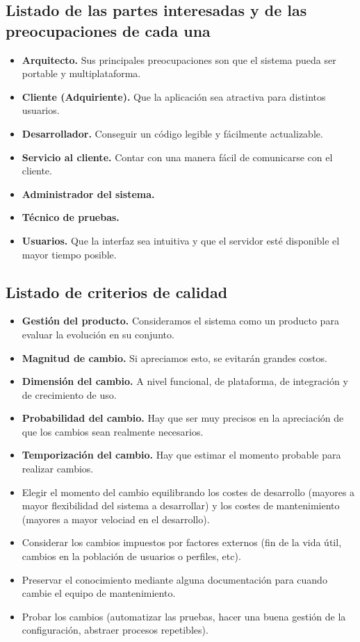 \documentclass{article}
\begin{document}
	\subsection{Listado de las partes interesadas y de las preocupaciones de cada una}
	\begin{itemize}
		\item {\bf Arquitecto.} Sus principales preocupaciones son que el sistema pueda ser portable y multiplataforma.
		\item {\bf Cliente (Adquiriente).} Que la aplicación sea atractiva para distintos usuarios.
		\item {\bf Desarrollador.} Conseguir un código legible y fácilmente actualizable.
		\item {\bf Servicio al cliente.} Contar con una manera fácil de comunicarse con el cliente.
		\item {\bf Administrador del sistema.} 
		\item {\bf Técnico de pruebas.} 
		\item {\bf Usuarios.} Que la interfaz sea intuitiva y que el servidor esté disponible el mayor tiempo posible.
	\end{itemize}

	\subsection{Listado de criterios de calidad}
	\begin{itemize}
		\item {\bf Gestión del producto.} Consideramos el sistema como un producto para evaluar la evolución en su conjunto.
		\item {\bf Magnitud de cambio.} Si apreciamos esto, se evitarán grandes costos.
		\item {\bf Dimensión del cambio.} A nivel funcional, de plataforma, de integración y de crecimiento de uso.
		\item {\bf Probabilidad del cambio.} Hay que ser muy precisos en la apreciación de que los cambios sean realmente necesarios.
		\item {\bf Temporización del cambio.} Hay que estimar el momento probable para realizar cambios.
		\item Elegir el momento del cambio equilibrando los costes de desarrollo (mayores a mayor flexibilidad del sistema a desarrollar) y los costes de mantenimiento (mayores a mayor velociad en el desarrollo).
		\item Considerar los cambios impuestos por factores externos (fin de la vida útil, cambios en la población de usuarios o perfiles, etc).
		\item Preservar el conocimiento mediante alguna documentación para cuando cambie el equipo de mantenimiento.
		\item Probar los cambios (automatizar las pruebas, hacer una buena gestión de la configuración, abstraer procesos repetibles).
	\end{itemize}
\end{document}
